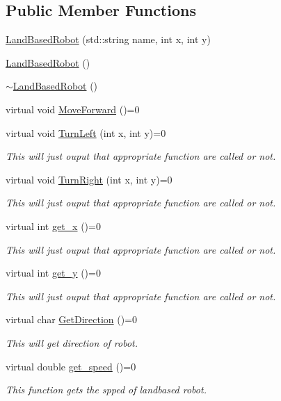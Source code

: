 \subsection*{Public Member Functions}
\begin{DoxyCompactItemize}
\item 
\hyperlink{classfp_1_1_land_based_robot_a3aabd7151068be36ba93ff5813223e0c}{Land\+Based\+Robot} (std\+::string name, int x, int y)
\item 
\hyperlink{classfp_1_1_land_based_robot_a3e16cc74a11f831186978ef27eca7b99}{Land\+Based\+Robot} ()
\item 
\hyperlink{classfp_1_1_land_based_robot_ad62091990dd9e40e9c68f7c52914be93}{$\sim$\+Land\+Based\+Robot} ()
\item 
virtual void \hyperlink{classfp_1_1_land_based_robot_a5df828c5d6c1f7fb4c7b68f53d9c6080}{Move\+Forward} ()=0
\item 
virtual void \hyperlink{classfp_1_1_land_based_robot_a359e1012e9093475b7a1b0d38e41a118}{Turn\+Left} (int x, int y)=0
\begin{DoxyCompactList}\small\item\em This will just ouput that appropriate function are called or not. \end{DoxyCompactList}\item 
virtual void \hyperlink{classfp_1_1_land_based_robot_a7360e4084bc5254f72ab0d3612644907}{Turn\+Right} (int x, int y)=0
\begin{DoxyCompactList}\small\item\em This will just ouput that appropriate function are called or not. \end{DoxyCompactList}\item 
virtual int \hyperlink{classfp_1_1_land_based_robot_a3624c5d041de0987c0103c6b01fa9bc6}{get\+\_\+x} ()=0
\begin{DoxyCompactList}\small\item\em This will just ouput that appropriate function are called or not. \end{DoxyCompactList}\item 
virtual int \hyperlink{classfp_1_1_land_based_robot_ae742797bee07ac5b92bfe934cbfed6e9}{get\+\_\+y} ()=0
\begin{DoxyCompactList}\small\item\em This will just ouput that appropriate function are called or not. \end{DoxyCompactList}\item 
virtual char \hyperlink{classfp_1_1_land_based_robot_a50841b6e40d4e92832770d26b427fea2}{Get\+Direction} ()=0
\begin{DoxyCompactList}\small\item\em This will get direction of robot. \end{DoxyCompactList}\item 
virtual double \hyperlink{classfp_1_1_land_based_robot_a68844e9c442d1b293945144dc6c6608c}{get\+\_\+speed} ()=0
\begin{DoxyCompactList}\small\item\em This function gets the spped of landbased robot. \end{DoxyCompactList}\end{DoxyCompactItemize}
